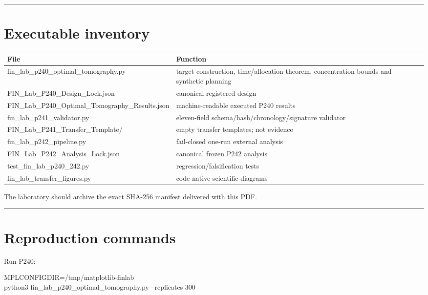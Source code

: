\documentclass[11pt,a4paper,openany]{report}
\begin{document}
\par\medskip\hrule\medskip

\chapter{Executable inventory}

\begin{center}
\begingroup\small
\setlength{\tabcolsep}{3.5pt}
\renewcommand{\arraystretch}{1.16}
\begin{longtable}{@{}p{}p{}@{}}
\toprule
\textbf{File} & \textbf{Function} \\
\midrule
\endhead
fin\_lab\_p240\_optimal\_tomography.py & target construction, time/\allowbreak{}allocation theorem, concentration bounds and synthetic planning \\
FIN\_Lab\_P240\_Design\_Lock.json & canonical registered design \\
FIN\_Lab\_P240\_Optimal\_Tomography\_Results.json & machine-readable executed P240 results \\
fin\_lab\_p241\_validator.py & eleven-field schema/\allowbreak{}hash/\allowbreak{}chronology/\allowbreak{}signature validator \\
FIN\_Lab\_P241\_Transfer\_Template/\allowbreak{} & empty transfer templates; not evidence \\
fin\_lab\_p242\_pipeline.py & fail-closed one-run external analysis \\
FIN\_Lab\_P242\_Analysis\_Lock.json & canonical frozen P242 analysis \\
test\_fin\_lab\_p240\_242.py & regression/\allowbreak{}falsification tests \\
fin\_lab\_transfer\_figures.py & code-native scientific diagrams \\
\bottomrule
\end{longtable}
\endgroup
\end{center}

The laboratory should archive the exact SHA-256 manifest delivered with this PDF.

\par\medskip\hrule\medskip

\chapter{Reproduction commands}

Run P240:

MPLCONFIGDIR=/\allowbreak{}tmp/\allowbreak{}matplotlib-finlab \\
python3 fin\_lab\_p240\_optimal\_tomography.py --replicates 300
\end{document}
